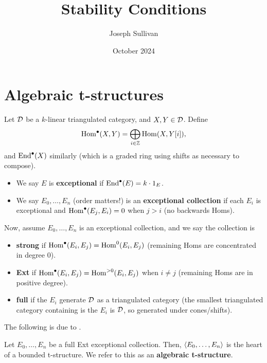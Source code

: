\documentclass[12pt]{article}
\title{Stability Conditions}
\author{Joseph Sullivan}
\date{October 2024}
\begin{document}
\maketitle
\tableofcontents

\section{Algebraic t-structures}

\begin{defn}
    Let $\mathcal{D}$ be a $k$-linear triangulated category, and $X,Y\in \mathcal{D}$. Define
    \[\mathrm{Hom}^\bullet(X,Y) = \bigoplus_{i\in \mathbb{Z}} \mathrm{Hom}(X,Y[i]),\]
    and $\operatorname{End}^\bullet(X)$ similarly (which is a graded ring using shifts as necessary to compose).

    \begin{itemize}
        \item We say $E$ is \textbf{exceptional} if $\operatorname{End}^\bullet(E) = k\cdot 1_E$.
        
        \item We say $E_0,\dots,E_n$ (order matters!) is an \textbf{exceptional collection} if each $E_i$ is exceptional and $\mathrm{Hom}^\bullet(E_j,E_i)=0$ when $j>i$ (no backwards Homs).
    \end{itemize}

    Now, assume $E_0,\dots,E_n$ is an exceptional collection, and we say the collection is
    \begin{itemize}
        \item \textbf{strong} if $\mathrm{Hom}^\bullet(E_i,E_j) = \mathrm{Hom}^0(E_i,E_j)$ (remaining Homs are concentrated in degree 0).

        \item \textbf{Ext} if $\mathrm{Hom}^\bullet(E_i,E_j) = \mathrm{Hom}^{>0}(E_i,E_j)$ when $i\neq j$ (remaining Homs are in positive degree).

        \item \textbf{full} if the $E_i$ generate $\mathcal{D}$ as a triangulated category (the smallest triangulated category containing is the $E_i$ is $\mathcal{D}$, so generated under cones/shifts).
    \end{itemize}
\end{defn}

The following is due to \cite{macri2007stabilityconditionscurves}.
\begin{prop} \label{algebraic-t-structure}
    Let $E_0,\dots,E_n$ be a full Ext exceptional collection. Then, $\left\langle E_0,\dots,E_n\right\rangle$ is the heart of a bounded t-structure. We refer to this as an \textbf{algebraic t-structure}.
\end{prop}
\end{document}

